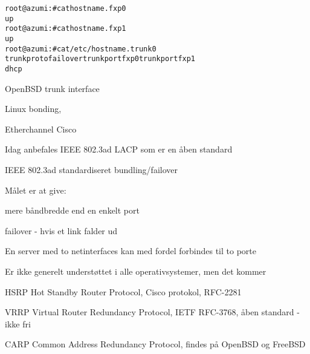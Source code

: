 \documentclass[Screen16to9,17pt]{foils}
\begin{document}
\begin{alltt}
root@azumi:# cat hostname.fxp0
up
root@azumi:# cat hostname.fxp1
up
root@azumi:# cat /etc/hostname.trunk0
trunkproto failover trunkport fxp0 trunkport fxp1
dhcp
\end{alltt}

\begin{list1}
\item OpenBSD trunk interface
\item Linux bonding,
\item Etherchannel Cisco
\item Idag anbefales IEEE 802.3ad LACP som er en åben standard
\item {}
\end{list1}



\begin{list1}
\item IEEE 802.3ad standardiseret bundling/failover
\item Målet er at give:
\begin{list2}
\item mere båndbredde end en enkelt port
\item failover - hvis et link falder ud
\end{list2}
\item En server med to netinterfaces kan med fordel forbindes til to porte
\item Er ikke generelt understøttet i alle operativsystemer, men det kommer
\item {}
\end{list1}




\begin{list1}
\item HSRP Hot Standby Router Protocol, Cisco protokol, RFC-2281
\item VRRP Virtual Router Redundancy Protocol, IETF RFC-3768, åben standard - ikke fri
\item CARP Common Address Redundancy Protocol, findes på OpenBSD og FreeBSD
\item {}
\end{list1}
\end{document}
